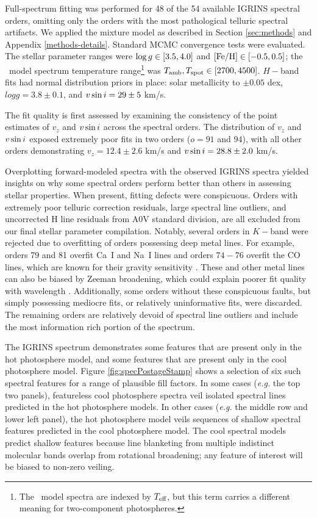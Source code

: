 \documentclass[twocolumn]{emulateapj}%
\begin{document}
Full-spectrum fitting was performed for 48 of the 54 available IGRINS spectral orders, omitting only the orders with the most pathological telluric spectral artifacts. We applied the mixture model as described in Section \ref{sec:methods} and Appendix \ref{methods-details}.  Standard MCMC convergence tests were evaluated.  The stellar parameter ranges were $\log g \in [3.5, 4.0]$ and $[{\rm Fe}/{\rm H}] \in [-0.5, 0.5]$; the \PHOENIX\ model spectrum temperature range\footnote{The \PHOENIX\ model spectra are indexed by $T_\textrm{eff}$, but this term carries a different meaning for two-component photospheres.} was $T_\textrm{amb}, T_\textrm{spot} \in [2700, 4500]$.  $H-$band fits had normal distribution priors in place: solar metallicity to $\pm0.05$ dex, $logg=3.8\pm0.1$, and $v \sin i=29\pm5$ km/s.

The fit quality is first assessed by examining the consistency of the point estimates of $v_z$ and $v \sin i$ across the spectral orders.  The distribution of $v_z$ and $v \sin i$ exposed extremely poor fits in two orders ($o=91$ and $94$), with all other orders demonstrating $v_z = 12.4 \pm 2.6$ km/s and $v \sin i = 28.8 \pm 2.0$ km/s.

Overplotting forward-modeled spectra with the observed IGRINS spectra yielded insights on why some spectral orders perform better than others in assessing stellar properties.  When present, fitting defects were conspicuous.  Orders with extremely poor telluric correction residuals, large spectral line outliers, and uncorrected H line residuals from A0V standard division, are all excluded from our final stellar parameter compilation.  Notably, several orders in $K-$band were rejected due to overfitting of orders possessing deep metal lines.  For example, orders 79 and 81 overfit Ca~I and Na~I lines and orders $74-76$ overfit the CO lines, which are known for their gravity sensitivity \citep{rayner09}.  These and other metal lines can also be biased by Zeeman broadening, which could explain poorer fit quality with wavelength \citep{johnskrull07,deen13}.  Additionally, some orders without these conspicuous faults, but simply possessing mediocre fits, or relatively uninformative fits, were discarded.  The remaining orders are relatively devoid of spectral line outliers and include the most information rich portion of the spectrum.

The IGRINS spectrum demonstrates some features that are present only in the hot photosphere model, and some features that are present only in the cool photosphere model.  Figure \ref{fig:specPostageStamp} shows a selection of six such spectral features for a range of plausible fill factors.  In some cases (\emph{e.g.} the top two panels), featureless cool photosphere spectra veil isolated spectral lines predicted in the hot photosphere models.  In other cases (\emph{e.g.} the middle row and lower left panel), the hot photosphere model veils sequences of shallow spectral features predicted in the cool photosphere model.  The cool spectral models predict shallow features because line blanketing from multiple indistinct molecular bands overlap from rotational broadening; any feature of interest will be biased to non-zero veiling.  
\end{document}
